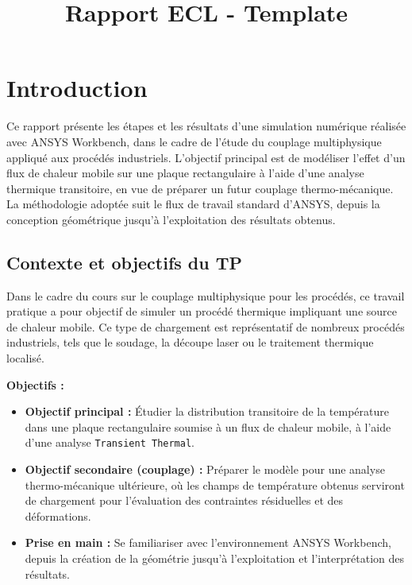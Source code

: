 \documentclass{rapportECL}
\title{Rapport ECL - Template} %
\begin{document}






        
\fairemarges %
\fairepagedegarde %
\tabledematieres %


\section{Introduction}

Ce rapport présente les étapes et les résultats d’une simulation numérique réalisée avec ANSYS Workbench, dans le cadre de l’étude du couplage multiphysique appliqué aux procédés industriels. L’objectif principal est de modéliser l’effet d’un flux de chaleur mobile sur une plaque rectangulaire à l’aide d’une analyse thermique transitoire, en vue de préparer un futur couplage thermo-mécanique. La méthodologie adoptée suit le flux de travail standard d’ANSYS, depuis la conception géométrique jusqu’à l’exploitation des résultats obtenus.

\subsection{Contexte et objectifs du TP}

Dans le cadre du cours sur le couplage multiphysique pour les procédés, ce travail pratique a pour objectif de simuler un procédé thermique impliquant une source de chaleur mobile. Ce type de chargement est représentatif de nombreux procédés industriels, tels que le soudage, la découpe laser ou le traitement thermique localisé.

\textbf{Objectifs :}
\begin{itemize}
    \item \textbf{Objectif principal :} Étudier la distribution transitoire de la température dans une plaque rectangulaire soumise à un flux de chaleur mobile, à l’aide d’une analyse \texttt{Transient Thermal}.
    \item \textbf{Objectif secondaire (couplage) :} Préparer le modèle pour une analyse thermo-mécanique ultérieure, où les champs de température obtenus serviront de chargement pour l’évaluation des contraintes résiduelles et des déformations.
    \item \textbf{Prise en main :} Se familiariser avec l’environnement ANSYS Workbench, depuis la création de la géométrie jusqu’à l’exploitation et l’interprétation des résultats.
\end{itemize}
\end{document}
